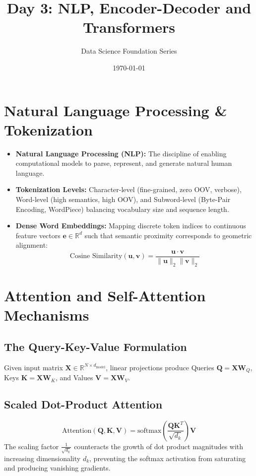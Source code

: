 \documentclass[11pt,a4paper]{article}
\title{\textbf{Day 3: NLP, Encoder-Decoder and Transformers}}
\author{Data Science Foundation Series}
\date{\today}
\begin{document}
\maketitle

\section{Natural Language Processing \& Tokenization}
\begin{itemize}
    \item \textbf{Natural Language Processing (NLP):} The discipline of enabling computational models to parse, represent, and generate natural human language.
    \item \textbf{Tokenization Levels:} Character-level (fine-grained, zero OOV, verbose), Word-level (high semantics, high OOV), and Subword-level (Byte-Pair Encoding, WordPiece) balancing vocabulary size and sequence length.
    \item \textbf{Dense Word Embeddings:} Mapping discrete token indices to continuous feature vectors $\mathbf{e} \in \mathbb{R}^d$ such that semantic proximity corresponds to geometric alignment:
    \begin{equation}
    \text{Cosine Similarity}(\mathbf{u}, \mathbf{v}) = \frac{\mathbf{u} \cdot \mathbf{v}}{\|\mathbf{u}\|_2 \|\mathbf{v}\|_2}
    \end{equation}
\end{itemize}

\section{Attention and Self-Attention Mechanisms}
\subsection{The Query-Key-Value Formulation}
Given input matrix $\mathbf{X} \in \mathbb{R}^{N \times d_{\text{model}}}$, linear projections produce Queries $\mathbf{Q} = \mathbf{X}\mathbf{W}_Q$, Keys $\mathbf{K} = \mathbf{X}\mathbf{W}_K$, and Values $\mathbf{V} = \mathbf{X}\mathbf{W}_V$.

\subsection{Scaled Dot-Product Attention}
\begin{equation}
\text{Attention}(\mathbf{Q}, \mathbf{K}, \mathbf{V}) = \text{softmax}\left(\frac{\mathbf{Q}\mathbf{K}^T}{\sqrt{d_k}}\right)\mathbf{V}
\end{equation}
The scaling factor $\frac{1}{\sqrt{d_k}}$ counteracts the growth of dot product magnitudes with increasing dimensionality $d_k$, preventing the softmax activation from saturating and producing vanishing gradients.
\end{document}
